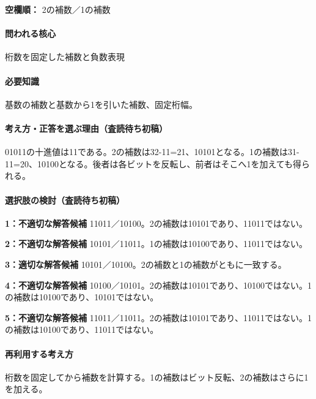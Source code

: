 \noindent\textbf{空欄順：} 2の補数／1の補数\par

\paragraph{問われる核心} 桁数を固定した補数と負数表現

\paragraph{必要知識} 基数の補数と基数から1を引いた補数、固定桁幅。

\paragraph{考え方・正答を選ぶ理由（査読待ち初稿）} 01011の十進値は11である。2の補数は32-11=\allowbreak{}21、10101となる。1の補数は31-11=\allowbreak{}20、10100となる。後者は各ビットを反転し、前者はそこへ1を加えても得られる。

\paragraph{選択肢の検討（査読待ち初稿）}\mbox{}\par

\noindent\textbf{1：不適切な解答候補} 11011／10100。2の補数は10101であり、11011ではない。\par

\noindent\textbf{2：不適切な解答候補} 10101／11011。1の補数は10100であり、11011ではない。\par

\noindent\textbf{3：適切な解答候補} 10101／10100。2の補数と1の補数がともに一致する。\par

\noindent\textbf{4：不適切な解答候補} 10100／10101。2の補数は10101であり、10100ではない。1の補数は10100であり、10101ではない。\par

\noindent\textbf{5：不適切な解答候補} 11011／11011。2の補数は10101であり、11011ではない。1の補数は10100であり、11011ではない。\par

\paragraph{再利用する考え方} 桁数を固定してから補数を計算する。1の補数はビット反転、2の補数はさらに1を加える。


